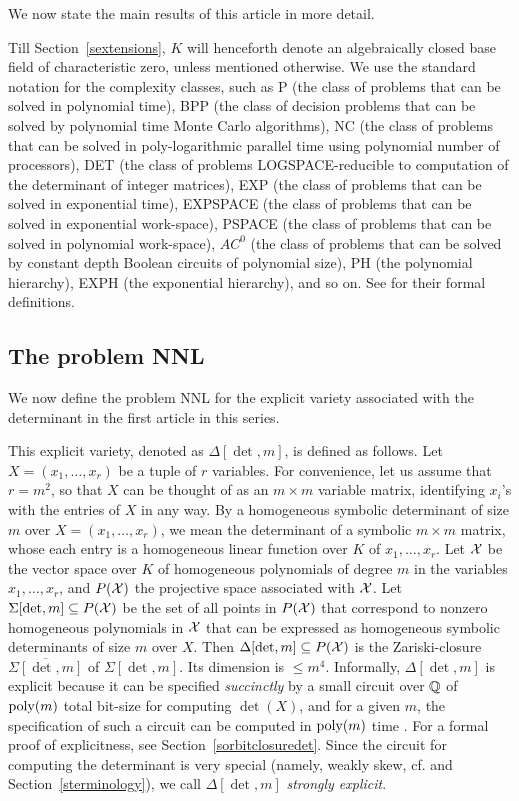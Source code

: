 \documentclass[11pt]{article}
\begin{document}
We now  state   the main results of this article in more detail.


 Till  Section~\ref{sextensions}, $K$ will henceforth denote  
an algebraically closed base field of characteristic zero, unless mentioned otherwise. 
We  use the standard notation for the complexity classes, such as P (the class of problems that can be solved in 
polynomial time), BPP (the class of decision problems that can be solved by polynomial time Monte Carlo algorithms),
NC (the class of problems that can be solved in poly-logarithmic parallel time using polynomial number of 
processors), DET (the class of  problems LOGSPACE-reducible to computation of the 
determinant of integer matrices),
EXP (the class of problems that can be solved in exponential time), EXPSPACE (the class of problems that can be solved in
exponential work-space), PSPACE (the class of problems that can be solved in polynomial work-space),
$AC^0$ (the class of problems that can be solved by constant depth Boolean circuits of polynomial size), 
PH (the polynomial hierarchy), 
EXPH (the exponential hierarchy), and so on. 
See \cite{arora,cook} for their formal definitions. 




\subsection{The problem  NNL} \label{sNNLdetintro}
We now define the problem NNL 
for the  explicit variety associated with 
the determinant in the first article \cite{GCT1} in this series. 

This explicit variety,  denoted as $\Delta[\det,m]$, is 
defined as follows. 
Let $X=(x_1,\ldots,x_r)$ be a tuple of $r$ variables.
For convenience, let us assume that $r=m^2$, so that $X$ can be thought of as an $m\times m$ variable matrix,
identifying $x_i$'s with the entries of $X$ in any way.
By a homogeneous symbolic determinant of size $m$ over $X=(x_1,\ldots,x_r)$, we mean 
the determinant of a symbolic $m \times m$ matrix, whose each entry is a homogeneous linear function over $K$ of $x_1,\ldots,x_r$.
Let ${\cal X}$ be the 
vector space over $K$ of homogeneous polynomials of degree $m$ in the variables $x_1,\ldots,x_r$, and
$P({\cal X})$ the projective space associated with ${\cal X}$.
Let $\Sigma[\det,m] \subseteq P({\cal X})$ be the set of all points in $P({\cal X})$ 
that correspond to nonzero homogeneous polynomials in ${\cal X}$ that can be expressed as homogeneous 
symbolic determinants of size $m$ over $X$. 
Then $\Delta[\det,m] \subseteq P({\cal X})$ is  the Zariski-closure $\overline{\Sigma[\det,m]}$ of
$\Sigma[\det,m]$. Its dimension is $\le m^4$. 
Informally, $\Delta[\det,m]$  is explicit because it can be specified {\em succinctly} by a small   circuit over $\mathbb{Q}$ 
of ${\mbox {poly}}(m)$ total bit-size for computing $\det(X)$, and for a given $m$,  the specification of 
such a circuit  can be computed in ${\mbox {poly}}(m)$ time \cite{skyum}.
For a formal proof of explicitness, see Section~\ref{sorbitclosuredet}.
Since the circuit \cite{skyum,malod} for computing the determinant is very special (namely, weakly skew, cf. \cite{malod} and
Section~\ref{sterminology}),
we call $\Delta[\det,m]$ {\em strongly explicit}.
\end{document}
